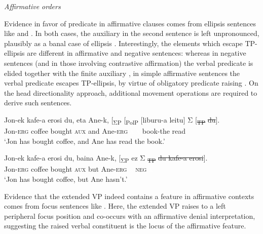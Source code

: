 \documentclass[output=paper]{langscibook}
\begin{document}
\ea \label{ex:haddican:35} \textit{Affirmative orders} \protect\label{tree-6} \\ \samepage
\z

Evidence in favor of predicate  in affirmative clauses comes from  ellipsis sentences like  and . In both cases, the auxiliary in the second sentence is left unpronounced, plausibly as a banal case of  ellipsis \citep{Laka1990}.  Interestingly, the elements which escape TP-ellipsis are different in affirmative and negative sentences: whereas in negative sentences (and in those involving contrastive affirmation) the verbal predicate is elided together with the finite auxiliary , in simple affirmative sentences the verbal predicate escapes TP-ellipsis, by virtue of obligatory predicate raising . On the head directionality approach, additional movement operations are required to derive such sentences.
 
\ea \label{ex:haddican:36} 
\gll  Jon-ek kafe-a erosi du, eta Ane-k, [\textsubscript{ΣP} [\textsubscript{PolP} [liburu-a leitu] Σ [\textsubscript{\sout{TP}} \sout{du}]. \\
	Jon-\textsc{erg} coffee bought \textsc{aux} and Ane-\textsc{erg} \textcolor{white}{x} \textcolor{white}{x} book-the read\\
\glt `Jon has bought coffee, and Ane has read the book.'
\z

\ea \label{ex:haddican:37}
\gll  Jon-ek kafe-a erosi du, baina Ane-k, [\textsubscript{ΣP}  ez Σ \textsubscript{\sout{TP}} \sout{du kafe-a erosi}].\\
	Jon-\textsc{erg} coffee bought \textsc{aux} but Ane-\textsc{erg}  \textcolor{white}{x} \textsc{neg} \textcolor{white}{x} \\ 
\glt `Jon has bought coffee, but Ane hasn't.'
\z
 
Evidence that the extended VP indeed contains a  feature in affirmative contexts comes from  focus sentences like .  Here, the extended VP raises to a left peripheral focus position and co-occurs with an affirmative denial interpretation, suggesting the raised verbal constituent is the locus of the affirmative feature.
\end{document}
